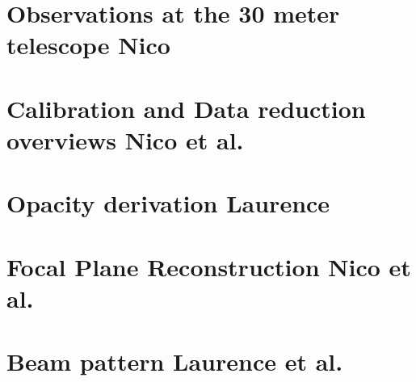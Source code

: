 \documentclass[a4paper, 11pt]{article} %
\begin{document}
\section{Observations at the 30 meter telescope {\color{blue} Nico}}
\label{se:observation}


\clearpage
\section{Calibration and Data reduction overviews {\color{blue} Nico et al.} }
\label{se:calib_pipeline}


\clearpage
\section{Opacity derivation {\color{blue} Laurence}}
\label{se:opacities}



\clearpage
\section{Focal Plane Reconstruction {\color{blue} Nico et al. }}
\label{se:fp_reconstruction}



\clearpage
\section{Beam pattern {\color{blue} Laurence et al.} }
\label{se:beams}

\end{document}

